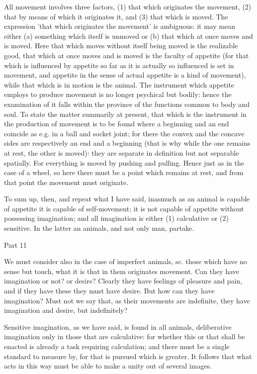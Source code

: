 All movement involves three factors, (1) that which originates the
movement, (2) that by means of which it originates it, and (3) that
which is moved. The expression 'that which originates the movement'
is ambiguous: it may mean either (a) something which itself is unmoved
or (b) that which at once moves and is moved. Here that which moves
without itself being moved is the realizable good, that which at once
moves and is moved is the faculty of appetite (for that which is influenced
by appetite so far as it is actually so influenced is set in movement,
and appetite in the sense of actual appetite is a kind of movement),
while that which is in motion is the animal. The instrument which
appetite employs to produce movement is no longer psychical but bodily:
hence the examination of it falls within the province of the functions
common to body and soul. To state the matter summarily at present,
that which is the instrument in the production of movement is to be
found where a beginning and an end coincide as e.g. in a ball and
socket joint; for there the convex and the concave sides are respectively
an end and a beginning (that is why while the one remains at rest,
the other is moved): they are separate in definition but not separable
spatially. For everything is moved by pushing and pulling. Hence just
as in the case of a wheel, so here there must be a point which remains
at rest, and from that point the movement must originate.

To sum up, then, and repeat what I have said, inasmuch as an animal
is capable of appetite it is capable of self-movement; it is not capable
of appetite without possessing imagination; and all imagination is
either (1) calculative or (2) sensitive. In the latter an animals,
and not only man, partake. 

Part 11

We must consider also in the case of imperfect animals, sc. those
which have no sense but touch, what it is that in them originates
movement. Can they have imagination or not? or desire? Clearly they
have feelings of pleasure and pain, and if they have these they must
have desire. But how can they have imagination? Must not we say that,
as their movements are indefinite, they have imagination and desire,
but indefinitely? 

Sensitive imagination, as we have said, is found in all animals, deliberative
imagination only in those that are calculative: for whether this or
that shall be enacted is already a task requiring calculation; and
there must be a single standard to measure by, for that is pursued
which is greater. It follows that what acts in this way must be able
to make a unity out of several images. 

